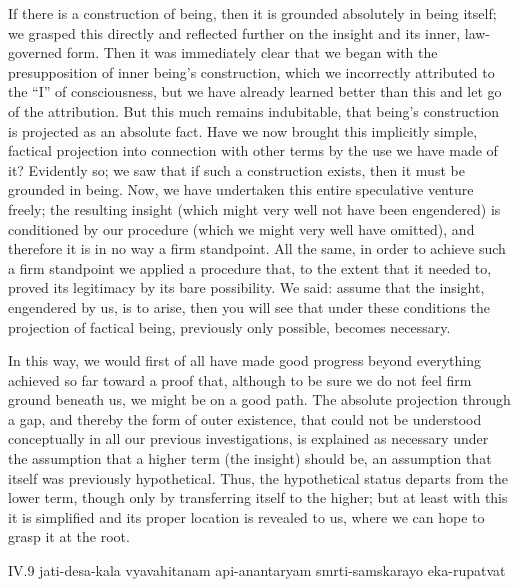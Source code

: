 If there is a construction of being,
then it is grounded absolutely in being itself;
we grasped this directly and reflected further on the
insight and its inner, law-governed form.
Then it was immediately clear that
we began with the presupposition of inner being's construction,
which we incorrectly attributed to the “I” of consciousness,
but we have already learned better than this
and let go of the attribution.
But this much remains indubitable,
that being's construction is projected as an absolute fact.
Have we now brought this implicitly simple, factical projection
into connection with other terms by the use we have made of it?
Evidently so; we saw that if such a construction exists,
then it must be grounded in being.
Now, we have undertaken this entire speculative venture freely;
the resulting insight
(which might very well not have been engendered)
is conditioned by our procedure
(which we might very well have omitted),
and therefore it is in no way a firm standpoint.
All the same, in order to achieve such a firm standpoint
we applied a procedure that, to the extent that it needed to,
proved its legitimacy by its bare possibility.
We said: assume that the insight, engendered by us,
is to arise, then you will see that under these conditions
the projection of factical being, previously only possible,
becomes necessary.

In this way, we would first of all have made
good progress beyond everything achieved so far
toward a proof that, although to be sure
we do not feel firm ground beneath us,
we might be on a good path.
The absolute projection through a gap,
and thereby the form of outer existence,
that could not be understood conceptually
in all our previous investigations,
is explained as necessary
under the assumption that
a higher term (the insight) should be,
an assumption that itself was previously hypothetical.
Thus, the hypothetical status departs from the lower term,
though only by transferring itself to the higher;
but at least with this it is simplified
and its proper location is revealed to us,
where we can hope to grasp it at the root.

IV.9
jati-desa-kala vyavahitanam api-anantaryam smrti-samskarayo eka-rupatvat

